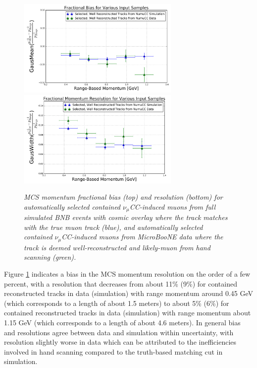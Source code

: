 \documentclass[a4paper,11pt]{article}
\begin{document}
\begin{figure}
\centering
	\includegraphics[width=0.7\textwidth]{Figures/MCS_range_bias_multiplesamples_publicplot.png}
	\includegraphics[width=0.7\textwidth]{Figures/MCS_range_resolution_multiplesamples_publicplot.png}
\caption{\textit{MCS momentum fractional bias (top) and resolution (bottom) for automatically selected contained $\nu_\mu$CC-induced muons from full simulated BNB events with cosmic overlay where the track matches with the true muon track (blue), and automatically selected contained $\nu_\mu$CC-induced muons from MicroBooNE data where the track is deemed well-reconstructed and likely-muon from hand scanning (green).}}\label{MCS_range_bias_resolution_DataRecoTrack_fig}
\end{figure}

Figure \ref{MCS_range_bias_resolution_DataRecoTrack_fig} indicates a bias in the MCS momentum resolution on the order of a few percent, with a resolution that decreases from about 11\% (9\%) for contained reconstructed tracks in data (simulation) with range momentum around 0.45 GeV (which corresponds to a length of about 1.5 meters) to about 5\% (6\%) for contained reconstructed tracks in data (simulation) with range momentum about 1.15 GeV (which corresponds to a length of about 4.6 meters). In general bias and resolutions agree between data and simulation within uncertainty, with resolution slightly worse in data which can be attributed to the inefficiencies involved in hand scanning compared to the truth-based matching cut in simulation.
\end{document}
